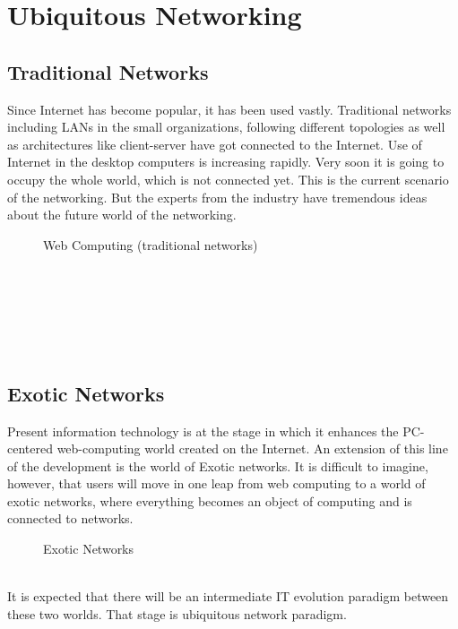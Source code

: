 \documentclass[12pt]{report}
\begin{document}
\chapter {Ubiquitous Networking}

\section{Traditional Networks}
\hspace*{0.5in}Since Internet has become popular, it has been used vastly. Traditional networks including LANs in the small organizations, following different topologies as well as architectures like client-server have got connected to the Internet. Use of Internet in the desktop computers is increasing rapidly. Very soon it is going to occupy the whole world, which is not connected yet. This is the current scenario of the networking. But the experts from the industry have tremendous ideas about the future world of the networking.
 \begin{figure}[h]
\begin{centre}
\centerline{}
\caption{Web Computing (traditional networks)}
\end{centre}
\end{figure}
\\
\\
\\
\\
\\

\section{Exotic Networks}
\hspace*{0.5in}Present information technology is at the stage in which it enhances the PC-centered web-computing world created on the Internet. An extension of this line of the development is the world of Exotic networks. It is difficult to imagine, however, that users will move in one leap from web computing to a world of exotic networks, where everything becomes an object of computing and is connected to networks.
\begin{figure}[h]
\begin{center}
\centerline{}
\caption{Exotic Networks}
\end{center}
\end{figure}
\\It is expected that there will be an intermediate IT evolution paradigm between these two worlds. That stage is ubiquitous network paradigm.
\end{document}
